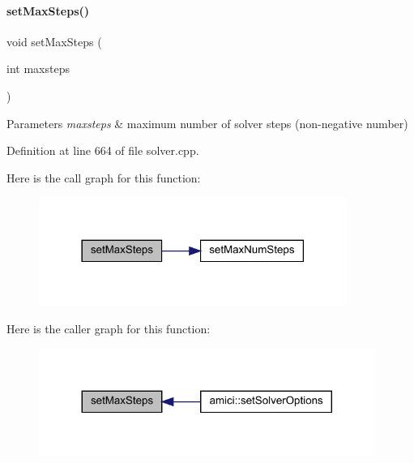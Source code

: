 \paragraph{\texorpdfstring{set\+Max\+Steps()}{setMaxSteps()}}
{\footnotesize\ttfamily void set\+Max\+Steps (\begin{DoxyParamCaption}\item[{int}]{maxsteps }\end{DoxyParamCaption})}


\begin{DoxyParams}{Parameters}
{\em maxsteps} & maximum number of solver steps (non-\/negative number) \\
\hline
\end{DoxyParams}


Definition at line 664 of file solver.\+cpp.

Here is the call graph for this function\+:
\nopagebreak
\begin{figure}[H]
\begin{center}
\leavevmode
\includegraphics[width=285pt]{classamici_1_1_solver_ab321627a9f9d22013638e0eb9b14d2dc_cgraph}
\end{center}
\end{figure}
Here is the caller graph for this function\+:
\nopagebreak
\begin{figure}[H]
\begin{center}
\leavevmode
\includegraphics[width=311pt]{classamici_1_1_solver_ab321627a9f9d22013638e0eb9b14d2dc_icgraph}
\end{center}
\end{figure}
\mbox{\label{classamici_1_1_solver_a8f683e8adf7b34cab6dff296b1d38c83}} 
